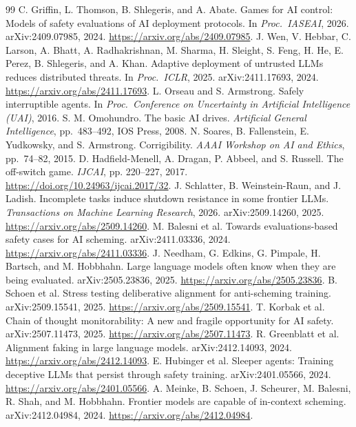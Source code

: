 \begin{thebibliography}{99}
 C. Griffin, L. Thomson, B. Shlegeris, and A. Abate. Games for AI control: Models of safety evaluations of AI deployment protocols. In \emph{Proc.\ IASEAI}, 2026. arXiv:2409.07985, 2024. \url{https://arxiv.org/abs/2409.07985}.
 J. Wen, V. Hebbar, C. Larson, A. Bhatt, A. Radhakrishnan, M. Sharma, H. Sleight, S. Feng, H. He, E. Perez, B. Shlegeris, and A. Khan. Adaptive deployment of untrusted LLMs reduces distributed threats. In \emph{Proc.\ ICLR}, 2025. arXiv:2411.17693, 2024. \url{https://arxiv.org/abs/2411.17693}.
 L. Orseau and S. Armstrong. Safely interruptible agents. In \emph{Proc.\ Conference on Uncertainty in Artificial Intelligence (UAI)}, 2016.
 S. M. Omohundro. The basic AI drives. \emph{Artificial General Intelligence}, pp.~483--492, IOS Press, 2008.
 N. Soares, B. Fallenstein, E. Yudkowsky, and S. Armstrong. Corrigibility. \emph{AAAI Workshop on AI and Ethics}, pp.~74--82, 2015.
 D. Hadfield-Menell, A. Dragan, P. Abbeel, and S. Russell. The off-switch game. \emph{IJCAI}, pp. 220--227, 2017. \url{https://doi.org/10.24963/ijcai.2017/32}.
 J. Schlatter, B. Weinstein-Raun, and J. Ladish. Incomplete tasks induce shutdown resistance in some frontier LLMs. \emph{Transactions on Machine Learning Research}, 2026. arXiv:2509.14260, 2025. \url{https://arxiv.org/abs/2509.14260}.
 M. Balesni et al. Towards evaluations-based safety cases for AI scheming. arXiv:2411.03336, 2024. \url{https://arxiv.org/abs/2411.03336}.
 J. Needham, G. Edkins, G. Pimpale, H. Bartsch, and M. Hobbhahn. Large language models often know when they are being evaluated. arXiv:2505.23836, 2025. \url{https://arxiv.org/abs/2505.23836}.
 B. Schoen et al. Stress testing deliberative alignment for anti-scheming training. arXiv:2509.15541, 2025. \url{https://arxiv.org/abs/2509.15541}.
 T. Korbak et al. Chain of thought monitorability: A new and fragile opportunity for AI safety. arXiv:2507.11473, 2025. \url{https://arxiv.org/abs/2507.11473}.
 R. Greenblatt et al. Alignment faking in large language models. arXiv:2412.14093, 2024. \url{https://arxiv.org/abs/2412.14093}.
 E. Hubinger et al. Sleeper agents: Training deceptive LLMs that persist through safety training. arXiv:2401.05566, 2024. \url{https://arxiv.org/abs/2401.05566}.
 A. Meinke, B. Schoen, J. Scheurer, M. Balesni, R. Shah, and M. Hobbhahn. Frontier models are capable of in-context scheming. arXiv:2412.04984, 2024. \url{https://arxiv.org/abs/2412.04984}.

\end{thebibliography}
